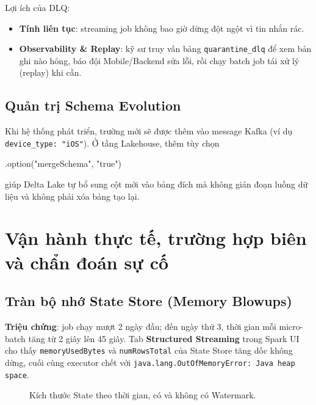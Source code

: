 \documentclass[12pt]{article}
\begin{document}
Lợi ích của DLQ:
\begin{itemize}
    \item \textbf{Tính liên tục}: streaming job không bao giờ dừng đột ngột vì tin nhắn rác.
    \item \textbf{Observability \& Replay}: kỹ sư truy vấn bảng \texttt{quarantine\_dlq} để xem bản ghi nào hỏng, báo đội Mobile/Backend sửa lỗi, rồi chạy batch job tái xử lý (replay) khi cần.
\end{itemize}

\subsection{Quản trị Schema Evolution}

Khi hệ thống phát triển, trường mới sẽ được thêm vào message Kafka (ví dụ \texttt{device\_type: "iOS"}). Ở tầng Lakehouse, thêm tùy chọn

\begin{aivnpybox}[mergeSchema]
.option("mergeSchema", "true")
\end{aivnpybox}

giúp Delta Lake tự bổ sung cột mới vào bảng đích mà không gián đoạn luồng dữ liệu và không phải xóa bảng tạo lại.

\section{Vận hành thực tế, trường hợp biên và chẩn đoán sự cố}

\subsection{Tràn bộ nhớ State Store (Memory Blowups)}

\textbf{Triệu chứng}: job chạy mượt 2 ngày đầu; đến ngày thứ 3, thời gian mỗi micro-batch tăng từ 2 giây lên 45 giây. Tab \textbf{Structured Streaming} trong Spark UI cho thấy \texttt{memoryUsedBytes} và \texttt{numRowsTotal} của State Store tăng dốc không dừng, cuối cùng executor chết với \texttt{java.lang.OutOfMemoryError: Java heap space}.

\begin{figure}[H]
\centering
{}
\caption{Kích thước State theo thời gian, có và không có Watermark.}
\label{fig:state-size}
\end{figure}
\end{document}
